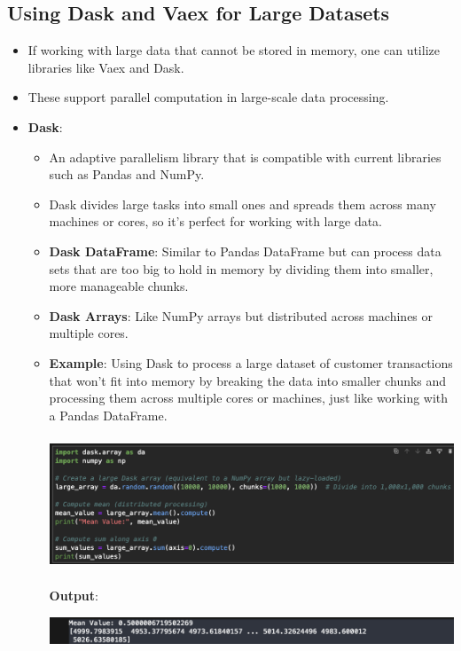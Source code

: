 \documentclass{article}
\begin{document}
\subsection{Using Dask and Vaex for Large Datasets}
\begin{itemize}
\item If working with large data that cannot be stored in memory, one can utilize libraries like Vaex and Dask.
\item These support parallel computation in large-scale data processing.
\item \textbf{Dask}:
\begin{itemize}
\item An adaptive parallelism library that is compatible with current libraries such as Pandas and NumPy.
\item Dask divides large tasks into small ones and spreads them across many machines or cores, so it's perfect for working with large data.
\item \textbf{Dask DataFrame}: Similar to Pandas DataFrame but can process data sets that are too big to hold in memory by dividing them into smaller, more manageable chunks.
\item \textbf{Dask Arrays}: Like NumPy arrays but distributed across machines or multiple cores.
\item\textbf{Example}: Using Dask to process a large dataset of customer transactions that won’t fit into memory by breaking the data into smaller chunks and processing them across multiple cores or machines, just like working with a Pandas DataFrame.

\includegraphics[width=14cm,height=4cm]{Dask.png}

\textbf{Output}:

\includegraphics[width=14cm,height=2
cm]{Dask_Output.png}
\end{itemize}


\end{itemize}
\end{document}
